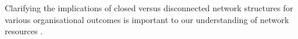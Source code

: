 Clarifying the implications of closed versus disconnected network structures for various organisational outcomes is important to our understanding of network resources \citep{ahuja2000collaboration}. \medskip

